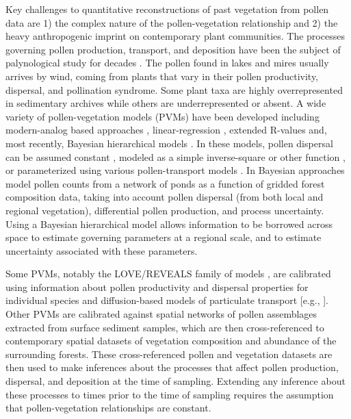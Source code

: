\documentclass[12pt]{article}
\begin{document}
Key challenges to quantitative reconstructions of past vegetation from
pollen data are 1) the complex nature of the pollen-vegetation
relationship and 2) the heavy anthropogenic imprint on contemporary
plant communities. The processes governing pollen production,
transport, and deposition have been the subject of palynological study
for decades \citep{tauber1965, jacobson1981selection,
  jackson1994pollen, jackson1999pollen, sugita2007theory1,
  sugita2007theory2, prentice1988records}. The pollen found in lakes
and mires usually arrives by wind, coming from plants that vary in
their pollen productivity, dispersal, and pollination syndrome. Some
plant taxa are highly overrepresented in sedimentary archives while
others are underrepresented or absent. A wide variety of
pollen-vegetation models (PVMs) have been developed including
modern-analog based approaches \citep{williams2003variations},
linear-regression \citep{webb1981estimating,
  bradshaw1985relationships}, extended R-values
\citep{parsons1981statistical, sugita1994pollen, sugita2007theory1,
  sugita2007theory2} and, most recently, Bayesian hierarchical models
\citep{paciorek2009mapping, garreta2010method}.  In these models,
pollen dispersal can be assumed constant \citep{davis1963theory,
  parsons1981statistical}, modeled as a simple inverse-square or other
function \citep{webb1981estimating, calcote1995pollen,
  jackson1998quantitative}, or parameterized using various
pollen-transport models \citep{prentice1988records, sugita2007theory1,
  sugita2007theory2, jackson1999pollen}. In \citet{paciorek2009mapping}  Bayesian approaches model
pollen counts from a network of ponds as a function of gridded forest
composition data, taking into account pollen dispersal (from both local
and regional vegetation), differential pollen production, and process
uncertainty. Using a Bayesian hierarchical model allows information to
be borrowed across space to estimate governing parameters at a
regional scale, and to estimate uncertainty associated with these
parameters.

Some PVMs, notably the LOVE/REVEALS family of models
\citep{sugita2007theory1, sugita2007theory2}, are calibrated using
information about pollen productivity and dispersal properties for
individual species and diffusion-based models of particulate transport
[e.g., \citet{prentice1985pollen}]. Other PVMs are calibrated against
spatial networks of pollen assemblages extracted from surface sediment
samples, which are then cross-referenced to contemporary spatial
datasets of vegetation composition and abundance of the surrounding
forests. These cross-referenced pollen and vegetation datasets are
then used to make inferences about the processes that affect pollen
production, dispersal, and deposition at the time of
sampling. Extending any inference about these processes to times prior
to the time of sampling requires the assumption that pollen-vegetation
relationships are constant.
\end{document}
